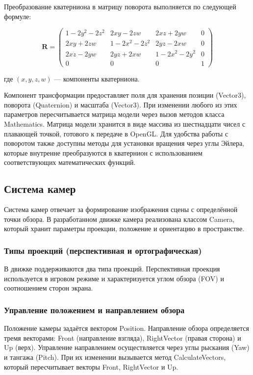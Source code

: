Преобразование кватерниона в матрицу поворота выполняется по следующей формуле:

$$
\mathbf{R} = \begin{pmatrix}
	1 - 2y^2 - 2z^2 & 2xy - 2zw & 2xz + 2yw & 0 \\
	2xy + 2zw & 1 - 2x^2 - 2z^2 & 2yz - 2xw & 0 \\
	2xz - 2yw & 2yz + 2xw & 1 - 2x^2 - 2y^2 & 0 \\
	0 & 0 & 0 & 1
\end{pmatrix}
$$

где $(x, y, z, w)$ — компоненты кватерниона.

Компонент трансформации предоставляет поля для хранения позиции (Vector3), поворота (Quaternion) и масштаба (Vector3). При изменении любого из этих параметров пересчитывается матрица модели через вызов методов класса Mathematics. Матрица модели хранится в виде массива из шестнадцати чисел с плавающей точкой, готового к передаче в OpenGL. Для удобства работы с поворотом также доступны методы для установки вращения через углы Эйлера, которые внутренне преобразуются в кватернион с использованием соответствующих математических функций.

\subsection{Система камер}
Система камер отвечает за формирование изображения сцены с определённой точки обзора. В разработанном движке камера реализована классом Camera, который хранит параметры проекции, положение и ориентацию в пространстве.

\subsubsection{Типы проекций (перспективная и ортографическая)}
В движке поддерживаются два типа проекций. Перспективная проекция используется в игровом режиме и характеризуется углом обзора (FOV) и соотношением сторон экрана.

\subsubsection{Управление положением и направлением обзора}
Положение камеры задаётся вектором Position. Направление обзора определяется тремя векторами: Front (направление взгляда), RightVector (правая сторона) и Up (верх). Управление направлением осуществляется через углы рыскания (Yaw) и тангажа (Pitch). При их изменении вызывается метод CalculateVectors, который пересчитывает векторы Front, RightVector и Up.

